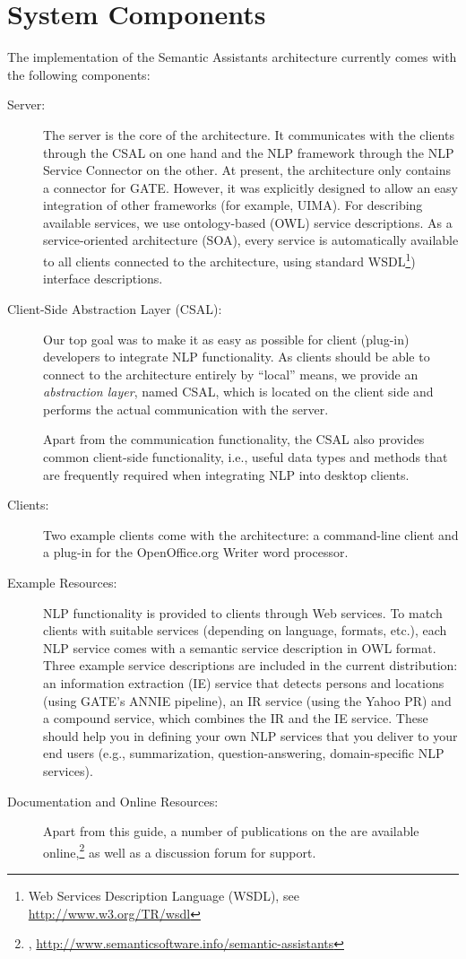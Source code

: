 \section{System Components}
\label{sec:syscomp}
The implementation of the Semantic Assistants architecture currently comes
with the following components:

\begin{description}
\item[Server:] The server is the core of the architecture.  It
  communicates with the clients through the CSAL on one hand and
  the NLP framework through the NLP Service Connector on the other.
  At present, the architecture only contains a connector for
  GATE. However, it was explicitly designed to allow an easy
  integration of other frameworks (for example, UIMA). For describing
  available services, we use ontology-based (OWL) service
  descriptions. As a service-oriented architecture (SOA), every
  service is automatically available to all clients connected to the
  architecture, using standard WSDL\footnote{Web Services Description
    Language (WSDL), see \url{http://www.w3.org/TR/wsdl}}) interface
  descriptions.

\item[Client-Side Abstraction Layer (CSAL):] Our top goal was to make
  it as easy as possible for client (plug-in) developers to integrate
  NLP functionality. As clients should be able to connect to the
  architecture entirely by ``local'' means, we provide an
  \emph{abstraction layer}, named CSAL, which is located on the client
  side and performs the actual communication with the server.

  Apart from the communication functionality, the CSAL also provides
  common client-side functionality, i.e., useful data types and
  methods that are frequently required when integrating NLP into
  desktop clients.

\item[Clients:] Two example clients come with the architecture: a
  command-line client and a plug-in for the OpenOffice.org Writer word
  processor. 

\item[Example Resources:] NLP functionality is provided to clients
  through Web services. To match clients with suitable services
  (depending on language, formats, etc.), each NLP service comes with
  a semantic service description in OWL format. Three example service
  descriptions are included in the current distribution: an
  information extraction (IE) service that detects persons and locations
  (using GATE's ANNIE pipeline), an IR service (using the Yahoo PR)
  and a compound service, which combines the IR and the IE
  service. These should help you in defining your own NLP services
  that you deliver to your end users (e.g., summarization,
  question-answering, domain-specific NLP services).

\item[Documentation and Online Resources:] Apart from this guide, a
  number of publications on the \sa are available
  online,\footnote{\sa,
    \url{http://www.semanticsoftware.info/semantic-assistants}} as
  well as a discussion forum for support.
\end{description}



